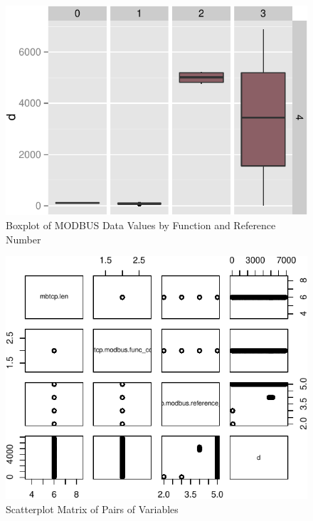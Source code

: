 \documentclass[11pt,a4paper]{article}
\begin{document}
\begin{figure}[h]

{\centering \includegraphics{thesis_files/figure-latex/unnamed-chunk-32-1} 

}

\caption{Boxplot of MODBUS Data Values by Function and Reference Number}\label{fig:unnamed-chunk-32}
\end{figure}

\begin{figure}[h]

{\centering \includegraphics{thesis_files/figure-latex/unnamed-chunk-33-1} 

}

\caption{Scatterplot Matrix of Pairs of Variables}\label{fig:unnamed-chunk-33}
\end{figure}
\end{document}
